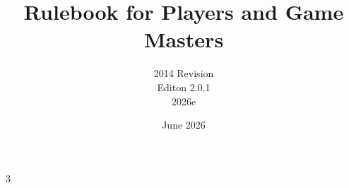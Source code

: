 \documentclass[a4paper]{report}
\begin{document}
\title{Rulebook for Players and Game Masters\\ \coverpic}
\author{2014 Revision\\Editon 2.0.1\\2026e}
\date{June 2026}

\maketitle





\pagebreak

\begin{multicols}{3}
\tableofcontents
\end{multicols}





























































\printindex
\end{document}
